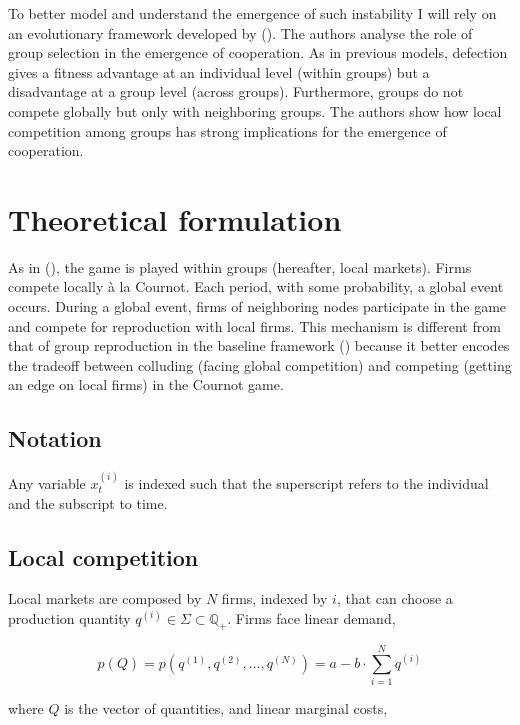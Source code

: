 \documentclass[american]{scrartcl}
\newcommand{\Rat}{\mathbb{Q}}
\newcommand{\citein}[1]{\citeauthor{#1} (\citeyear{#1})}
\begin{document}
To better model and understand the emergence of such instability I will rely on an evolutionary framework developed by \citein{Akdeniz2020}. The authors analyse the role of group selection in the emergence of cooperation. As in previous models, defection gives a fitness advantage at an individual level (within groups) but a disadvantage at a group level (across groups). Furthermore, groups do not compete globally but only with neighboring groups. The authors show how local competition among groups has strong implications for the emergence of cooperation.

\section{Theoretical formulation}

As in \citein{Akdeniz2020}, the game is played within groups (hereafter, local markets). Firms compete locally à la Cournot. Each period, with some probability, a global event occurs. During a global event, firms of neighboring nodes participate in the game and compete for reproduction with local firms. This mechanism is different from that of group reproduction in the baseline framework (\cite{Akdeniz2020}) because it better encodes the tradeoff between colluding (facing global competition) and competing (getting an edge on local firms) in the Cournot game.

\subsection{Notation}

Any variable $x^{(i)}_t$ is indexed such that the superscript refers to the individual and the subscript to time.

\subsection{Local competition}

Local markets are composed by $N$ firms, indexed by $i$, that can choose a production quantity $q^{(i)} \in \Sigma \subset \Rat_+$. Firms face linear demand,

\begin{equation}
    p(Q) = p\left(q^{(1)}, q^{(2)},  \ldots, q^{(N)} \right) = a - b \cdot \sum^{N}_{i=1} q^{(i)}
\end{equation}

where $Q$ is the vector of quantities, and linear marginal costs,
\end{document}
